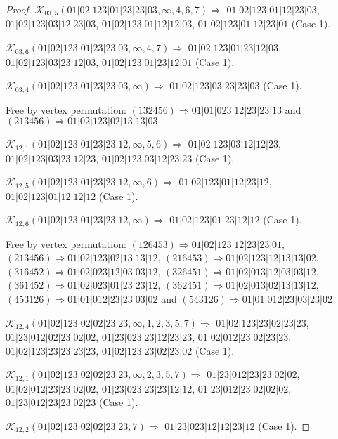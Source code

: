 \documentclass[12pt]{article}
\theoremstyle{plain}
\theoremstyle{definition}
\theoremstyle{remark}
\newcommand{\fancy}[1]{\mathcal{#1}}
\def\K{\fancy{K}}
\begin{document}
\begin{proof}
	\bigskip
	
	$\K_{03,5}(01|02|123|01|23|23|03,\infty,4, 6, 7)\Rightarrow $ $01|02|123|01|12|23|03$, $01|02|123|03|12|23|03$, $01|02|123|01|12|12|03$, $01|02|123|01|12|23|01$ (Case 1).
	
	$\K_{03,6}(01|02|123|01|23|23|03,\infty,4, 7)\Rightarrow $ $01|02|123|01|23|12|03$, $01|02|123|03|23|12|03$, $01|02|123|01|23|12|01$ (Case 1).
	
	$\K_{03,4}(01|02|123|01|23|23|03,\infty)\Rightarrow $ $01|02|123|03|23|23|03$ (Case 1).
	
	
	
	Free by vertex permutation: $(1 3 2 4 5 6)\Rightarrow 01|01|023|12|23|23|13$ and $(2 1 3 4 5 6)\Rightarrow 01|02|123|02|13|13|03$
	
	
	
	\bigskip
	
	$\K_{12,1}(01|02|123|01|23|23|12,\infty,5, 6)\Rightarrow $ $01|02|123|03|12|12|23$, $01|02|123|03|23|12|23$, $01|02|123|03|12|23|23$ (Case 1).
	
	$\K_{12,5}(01|02|123|01|23|23|12,\infty,6)\Rightarrow $ $01|02|123|01|12|23|12$, $01|02|123|01|12|12|12$ (Case 1).
	
	$\K_{12,6}(01|02|123|01|23|23|12,\infty)\Rightarrow $ $01|02|123|01|23|12|12$ (Case 1).
	
	
	
	Free by vertex permutation: $(1 2 6 4 5 3)\Rightarrow 01|02|123|12|23|23|01$, $(2 1 3 4 5 6)\Rightarrow 01|02|123|02|13|13|12$, $(2 1 6 4 5 3)\Rightarrow 01|02|123|12|13|13|02$, $(3 1 6 4 5 2)\Rightarrow 01|02|023|12|03|03|12$, $(3 2 6 4 5 1)\Rightarrow 01|02|013|12|03|03|12$, $(3 6 1 4 5 2)\Rightarrow 01|02|023|01|23|23|12$, $(3 6 2 4 5 1)\Rightarrow 01|02|013|02|13|13|12$, $(4 5 3 1 2 6)\Rightarrow 01|01|012|23|23|03|02$ and $(5 4 3 1 2 6)\Rightarrow 01|01|012|23|03|23|02$
	
	
	
	\bigskip
	
	$\K_{12,4}(01|02|123|02|02|23|23,\infty,1, 2, 3, 5, 7)\Rightarrow $ $01|02|123|23|02|23|23$, $01|23|012|02|23|02|02$, $01|23|023|23|12|23|23$, $01|02|012|23|02|23|23$, $01|02|123|23|23|23|23$, $01|02|123|23|02|23|02$ (Case 1).
	
	$\K_{12,1}(01|02|123|02|02|23|23,\infty,2, 3, 5, 7)\Rightarrow $ $01|23|012|23|23|02|02$, $01|02|012|23|23|02|02$, $01|23|023|23|23|12|12$, $01|23|012|23|02|02|02$, $01|23|012|23|23|02|23$ (Case 1).
	
	$\K_{12,2}(01|02|123|02|02|23|23,7)\Rightarrow $ $01|23|023|12|12|23|12$ (Case 1).
	

\end{proof}
\end{document}
